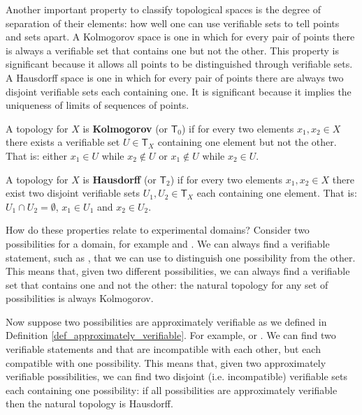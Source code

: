 \documentclass[11pt,letterpaper,fleqn]{memoir} %
\begin{document}
Another important property to classify topological spaces is the degree of separation of their elements: how well one can use verifiable sets to tell points and sets apart. A Kolmogorov space is one in which for every pair of points there is always a verifiable set that contains one but not the other. This property is significant because it allows all points to be distinguished through verifiable sets. A Hausdorff space is one in which for every pair of points there are always two disjoint verifiable sets each containing one. It is significant because it implies the uniqueness of limits of sequences of points.

\begin{mathSection}
	\begin{defn}
		A topology for $X$ is \textbf{Kolmogorov} (or $\mathsf{T}_0$) if for every two elements $x_1, x_2 \in X$ there exists a verifiable set $U \in \mathsf{T}_X$ containing one element but not the other. That is: either $x_1 \in U$ while $x_2 \notin U$ or $x_1 \notin U$ while $x_2 \in U$.
	\end{defn}
	\begin{defn}
	A topology for $X$ is \textbf{Hausdorff} (or $\mathsf{T}_2$) if for every two elements $x_1, x_2 \in X$ there exist two disjoint verifiable sets $U_1, U_2 \in \mathsf{T}_X$ each containing one element. That is: $U_1 \cap U_2 = \emptyset$, $x_1 
	\in U_1$ and $x_2 \in U_2$.
\end{defn}

\end{mathSection}

How do these properties relate to experimental domains? Consider two possibilities for a domain, for example  and . We can always find a verifiable statement, such as , that we can use to distinguish one possibility from the other. This means that, given two different possibilities, we can always find a verifiable set that contains one and not the other: the natural topology for any set of possibilities is always Kolmogorov.

Now suppose two possibilities are approximately verifiable as we defined in Definition \ref{def_approximately_verifiable}. For example,  or . We can find two verifiable statements  and  that are incompatible with each other, but each compatible with one possibility. This means that, given two approximately verifiable possibilities, we can find two disjoint (i.e. incompatible) verifiable sets each containing one possibility: if all possibilities are approximately verifiable then the natural topology is Hausdorff.
\end{document}
